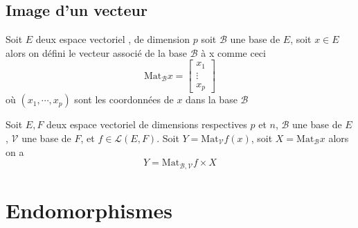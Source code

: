 \documentclass[11pt,colorlinks]{book}
\theoremstyle{mytheoremstyle}
\theoremstyle{mytheoremstyle}
\theoremstyle{mytheoremstyle}
\theoremstyle{mytheoremstyle}
\theoremstyle{mytheoremstyle}
\theoremstyle{mytheoremstyle}
\theoremstyle{mytheoremstyle}
\theoremstyle{mytheoremstyle}
\theoremstyle{myproblemstyle}
\def\mfc#1{\mathcal{#1}}
\def\ev{espace vectoriel }
\def\mor{\mfc{L}(E,F)}
\begin{document}
\subsection{Image d'un vecteur}
\begin{definition}
  Soit $E$ deux \ev, de dimension $p$ soit $\mfc{B}$ une base de $E$,
  soit $x \in E$ alors on défini le vecteur associé de la base $\mfc{B}$ à x comme ceci
  \begin{equation*}
    \text{Mat}_{\mfc{B}} x = \begin{bmatrix}
      x_1 \\ 
      \vdots \\ 
      x_p
    \end{bmatrix}
  \end{equation*}
  où $(x_1,\cdots,x_p)$ sont les coordonnées de $x$ dans la base $\mfc{B}$
\end{definition}
\begin{prop}
  Soit $E,F$ deux \ev de dimensions respectives $p$ et $n$, $\mfc{B}$ une base de $E$, $\mfc{V}$ une base de $F$, et $f \in \mor$.
  Soit $Y = \text{Mat}_{\mfc{V}} f(x)$, soit $X = \text{Mat}_{\mfc{B}} x$ alors on a 
  \begin{equation*}
    Y = \text{Mat}_{\mfc{B},\mfc{V}} f \times X
  \end{equation*}
\end{prop}
\section{Endomorphismes}
\end{document}
